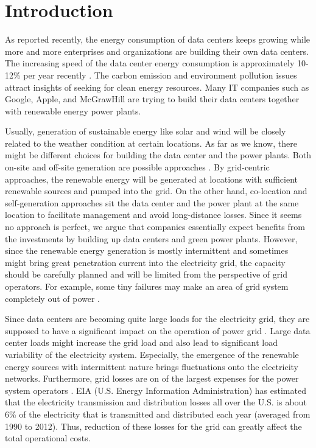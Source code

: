 \section{Introduction}
\label{sec:intro}

As reported recently, the energy consumption of data centers keeps growing while more and more enterprises and organizations are building their own data centers\cite{urgaonkar2011optimal,Koomey2011}. The increasing speed of the data center energy consumption is approximately 10-12\% per year recently \cite{ghatikar2014demand}. The carbon emission and environment pollution issues attract insights of seeking for clean energy resources. Many IT companies such as Google\cite{GoogleGreen}, Apple\cite{Apple13}, and McGrawHill\cite{McGrawHill11} are trying to build their data centers together with renewable energy power plants.

Usually, generation of sustainable energy like solar and wind will be closely related to the weather condition at certain locations. As far as we know, there might be different choices for building the data center and the power plants. Both on-site and off-site generation are possible approaches \cite {Goiri13}. By grid-centric approaches, the renewable energy will be generated at locations with sufficient renewable sources and pumped into the grid. On the other hand, co-location and self-generation approaches sit the data center and the power plant at the same location to facilitate management and avoid long-distance losses. Since it seems no approach is perfect, we argue that companies essentially expect benefits from the investments by building up data centers and green power plants. However, since the renewable energy generation is mostly intermittent and sometimes might bring great penetration current into the electricity grid, the capacity should be carefully planned and will be limited from the perspective of grid operators. For example, some tiny failures may make an area of grid system completely out of power \cite{nytimes2014}.

Since data centers are becoming quite large loads for the electricity grid, they are supposed to have a significant impact on the operation of power grid \cite{haowang2014grid}. Large data center loads might increase the grid load and also lead to significant load variability of the electricity system. Especially, the emergence of the renewable energy sources with intermittent nature brings fluctuations onto the electricity networks. Furthermore, grid losses are on of the largest expenses for the power system operators \cite{de2014investigation}. EIA (U.S. Energy Information Administration) \cite{EIA} has estimated that the electricity transmission and distribution losses all over the U.S. is about 6\% of the electricity that is transmitted and distributed each year (averaged from 1990 to 2012). Thus, reduction of these losses for the grid can greatly affect the total operational costs.

